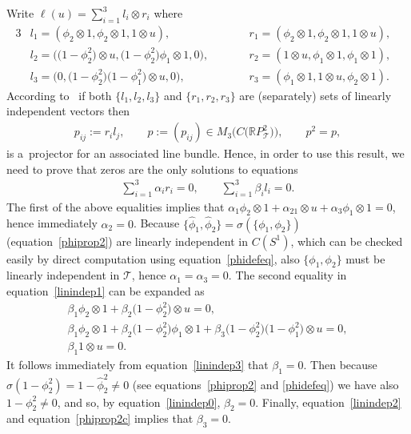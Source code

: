 \documentclass[pdftex]{sigma}
\newcommand{\proj}[2]{\mathbb{#1}P_\mathcal{T}^#2}
\begin{document}
Write $\ell(u)=\sum\limits_{i=1}^3l_i\otimes r_i$ where
\begin{alignat*}{3}
&l_1 =(\phi_2\otimes1,\phi_2\otimes1,1\otimes u),
\qquad&&
r_1 =(\phi_2\otimes1,\phi_2\otimes1,1\otimes u),&
\\
&l_2 =\big(\big(1-\phi_2^2\big)\otimes u,\big(1-\phi_2^2\big)\phi_1\otimes1,0\big),
\qquad&&
r_2 =(1\otimes u,\phi_1\otimes1,\phi_1\otimes 1),&
\\
& l_3 =\big(0,\big(1-\phi_2^2\big)\big(1-\phi_1^2\big)\otimes u,0\big),
\qquad&&
r_3 = (\phi_1\otimes1,1\otimes u,\phi_2\otimes 1).&
\end{alignat*}
According to~\cite[Theorem~3.1]{bh04} if both $\{l_1,l_2,l_3\}$ and $\{r_1,r_2,r_3\}$ are (separately) sets of linearly
independent vectors then
\begin{gather*}
p_{ij}:=r_il_j,
\qquad
p:=(p_{ij})\in M_3\big(C\big(\proj R2\big)\big),
\qquad
p^2=p,
\end{gather*}
is a~projector for an associated line bundle.
Hence, in order to use this result, we need to prove that zeros are the only solutions to equations
\begin{gather}
\sum\limits_{i=1}^3\alpha_ir_i=0,
\qquad
\sum\limits_{i=1}^3\beta_il_i=0.
\label{linindep1}
\end{gather}
The f\/irst  of the above equalities implies that $\alpha_1\phi_2\otimes 1+\alpha_21\otimes u+\alpha_3\phi_1\otimes 1=0$,
hence immediately $\alpha_2=0$.
Because $\{\hat\phi_1,\hat\phi_2\}=\sigma(\{\phi_1,\phi_2\})$ (equation~\eqref{phiprop2}) are linearly independent in
$C(S^1)$, which can be checked easily by direct computation using equation~\eqref{phidefeq}, also $\{\phi_1,\phi_2\}$ must be
linearly independent in ${\mathcal{T}}$, hence $\alpha_1=\alpha_3=0$.
The second equality in equation~\eqref{linindep1} can be expanded as
\begin{gather}
\beta_1\phi_2\otimes 1+\beta_2\big(1-\phi^2_2\big)\otimes u =0,
\label{linindep0}
\\
\beta_1\phi_2\otimes 1+\beta_2\big(1-\phi^2_2\big)\phi_1\otimes 1+\beta_3\big(1-\phi_2^2\big)\big(1-\phi_1^2\big)\otimes u =0,
\label{linindep2}
\\
\beta_1 1\otimes u =0.
\label{linindep3}
\end{gather}
It follows immediately from equation~\eqref{linindep3} that $\beta_1=0$.
Then because $\sigma(1-\phi_2^2)=1-\hat\phi_2^2\neq 0$ (see equations~\eqref{phiprop2} and \eqref{phidefeq}) we have also
$1-\phi_2^2\neq 0$, and so, by equation~\eqref{linindep0}, $\beta_2=0$.
Finally, equation~\eqref{linindep2} and equation~\eqref{phiprop2c} implies that $\beta_3=0$.
\end{document}
